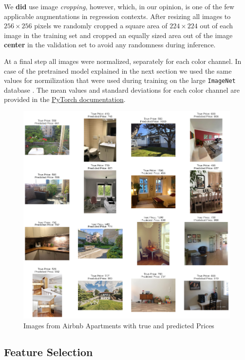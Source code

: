\documentclass[12pt, letterpaper]{article}
\begin{document}
\begin{appendices}
    We \textbf{did} use image \emph{cropping}, however, which, in our opinion, is one of the few applicable augmentations in regression contexts.
    After resizing all images to $256 \times 256$ pixels we randomly cropped a square area of $224 \times 224$ out of each image in the training set and cropped an equally sized area out of the image \textbf{center} in the validation set to avoid any randomness during inference.

    At a final step all images were normalized, separately for each color channel.
    In case of the pretrained model explained in the next section we used the same values for normilization that were used during training on the large \texttt{ImageNet} database \cite{russakovsky2015}.
    The mean values and standard deviations for each color channel are provided in the \href{https://pytorch.org/vision/stable/models.html}{PyTorch documentation}.

    \begin{figure}[t]
        \centering
        \includegraphics[width=\textwidth]{cnn_examples.png}
        \caption{Images from Airbnb Apartments with true and predicted Prices}
        \label{fig:cnn-examples}
    \end{figure}

    \subsection{Feature Selection} \label{appendix:feature-selection}


\end{appendices}
\end{document}
